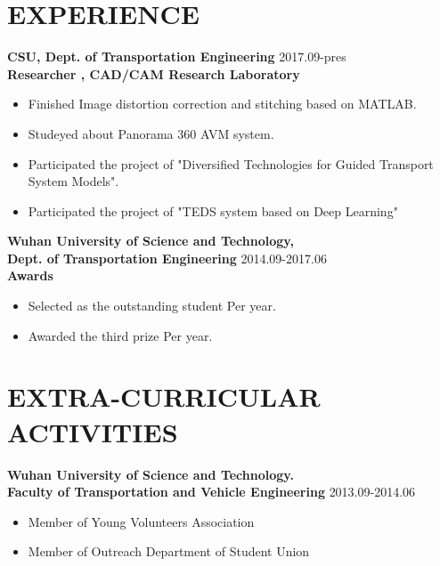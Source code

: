 \documentclass[margin]{res}
\begin{document}
\begin{resume}
 
\section{EXPERIENCE} \textbf { CSU, Dept. of Transportation Engineering   } \hfill 2017.09-pres \\
\textbf {Researcher , CAD/CAM Research Laboratory}
               
                 \begin{itemize}  
                 \itemsep -2pt %
                 \item  Finished Image distortion correction and stitching based on MATLAB.
                \item   Studeyed about Panorama 360 AVM system.
                \item   Participated the project of "Diversified Technologies for Guided Transport System Models".
                \item   Participated the project of "TEDS system based on Deep Learning"
                \end{itemize}
 \textbf { Wuhan University of Science and Technology, \\Dept. of Transportation Engineering   } \hfill 2014.09-2017.06 \\
               \textbf {Awards}
                 \begin{itemize}  
                 \itemsep -2pt %
                 \item  Selected as the outstanding student Per year.
                \item   Awarded the third prize Per year.
                \end{itemize}
               

\section{EXTRA-CURRICULAR \\ ACTIVITIES}   
                 \textbf { Wuhan University of Science and Technology.\\Faculty of Transportation and Vehicle Engineering  }  \hfill{2013.09-2014.06}\\
              \begin{itemize}  
                 \item Member of Young Volunteers Association
                 \item Member of  Outreach Department of Student Union
                 \end{itemize} 
                  

\end{resume}
\end{document}
